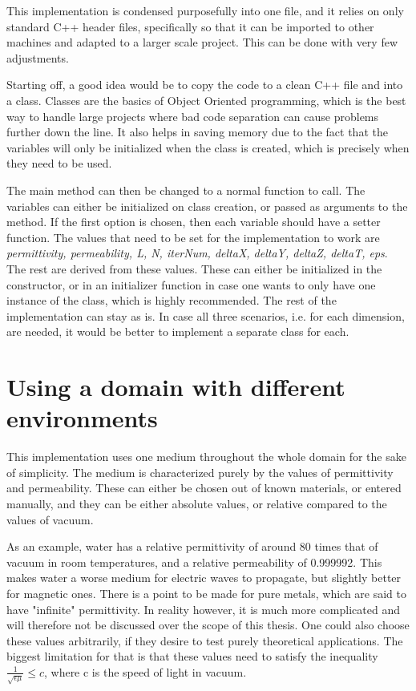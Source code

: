 This implementation is condensed purposefully into one file, and it relies on only standard C++ header files, specifically so that it can be imported to other machines and adapted to a larger scale project. This can be done with very few adjustments.

Starting off, a good idea would be to copy the code to a clean C++ file and into a class. Classes are the basics of Object Oriented programming, which is the best way to handle large projects where bad code separation can cause problems further down the line. It also helps in saving memory due to the fact that the variables will only be initialized when the class is created, which is precisely when they need to be used. 

The main method can then be changed to a normal function to call. The variables can either be initialized on class creation, or passed as arguments to the method. If the first option is chosen, then each variable should have a setter function. The values that need to be set for the implementation to work are \textit{permittivity, permeability, L, N, iterNum, deltaX, deltaY, deltaZ, deltaT, eps}. The rest are derived from these values. These can either be initialized in the constructor, or in an initializer function in case one wants to only have one instance of the class, which is highly recommended. The rest of the implementation can stay as is. In case all three scenarios, i.e. for each dimension, are needed, it would be better to implement a separate class for each.

\section{Using a domain with different environments}

This implementation uses one medium throughout the whole domain for the sake of simplicity. The medium is characterized purely by the values of permittivity and permeability. These can either be chosen out of known materials, or entered manually, and they can be either absolute values, or relative compared to the values of vacuum.

As an example, water has a relative permittivity of around 80 times that of vacuum in room temperatures\textsuperscript{\cite{archer1990dielectric}}, and a relative permeability of 0.999992. This makes water a worse medium for electric waves to propagate, but slightly better for magnetic ones. There is a point to be made for pure metals, which are said to have "infinite" permittivity. In reality however, it is much more complicated and will therefore not be discussed over the scope of this thesis. One could also choose these values arbitrarily, if they desire to test purely theoretical applications. The biggest limitation for that is that these values need to satisfy the inequality $\frac{1}{\sqrt{\epsilon\mu}} \leq c$, where c is the speed of light in vacuum. 

